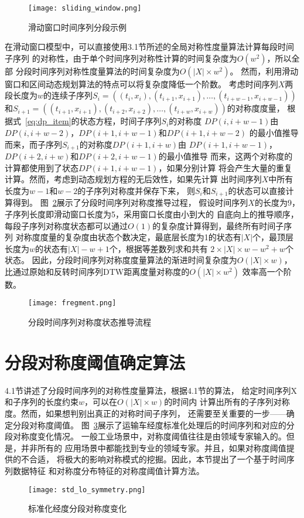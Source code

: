 \begin{figure}[h]
  \centering
  \texttt{[image: sliding\_window.png]}
  \caption{滑动窗口时间序列分段示例}
  \label{fig:sliding_window}
\end{figure}

在滑动窗口模型中，可以直接使用3.1节所述的全局对称性度量算法计算每段时间子序列
的对称性，由于单个时间序列对称性计算的时间复杂度为$O(w^2 )$，所以全部
分段时间序列对称性度量算法的时间复杂度为$O\left(|X| \times w^{2}\right)$。
然而，利用滑动窗口和区间动态规划算法的特点可以将复杂度降低一个阶数。
考虑时间序列$X$两段长度为$w$的连续子序列$S_{i}=\left(\left(t_{i}, x_{i}\right),\left(t_{i+1}, x_{i+1}\right), \dots,\left(t_{i+w-1}, x_{i+w-1}\right)\right)$
和$S_{i+1}=\left(\left(t_{i+1}, x_{i+1}\right),\left(t_{i+2}, x_{i+2}\right), \dots,\left(t_{i+w}, x_{i+w}\right)\right)$的对称度度量，
根据式~\ref{eq:dp_item}的状态方程，时间子序列$S_i$的对称度
$D P(i, i+w-1)$由$DP(i,i+w-2)$，$DP(i+1,i+w-1)$和$DP(i+1,i+w-2)$
的最小值推导而来，而子序列$S_{i+1}$的对称度$D P(i+1, i+w)$由
$D P(i+1, i+w-1)$，$DP(i+2,i+w)$和$DP(i+2,i+w-1)$的最小值推导
而来，这两个对称度的计算都使用到了状态$DP(i+1,i+w-1)$，如果分别计算
将会产生大量的重复计算。然而，考虑到动态规划方程的无后效性，如果先计算
出时间序列$X$中所有长度为$w-1$和$w-2$的子序列对称度并保存下来，
则$S_i$和$S_{i+1}$的状态可以直接计算得到。
图~\ref{fig:fregment}展示了分段时间序列对称度推导过程，
假设时间序列$X$的长度为9，子序列长度即滑动窗口长度为5，采用窗口长度由小到大的
自底向上的推导顺序，每段子序列对称度状态都可以通过$O(1)$的复杂度计算得到，最终所有时间子序列
对称度度量的复杂度由状态个数决定，最底层长度为1的状态有$|X|$个，最顶层
长度为$w$的状态有$|X|-w+1$个，根据等差数列求和共有
$2 \times|X| \times w-w^{2}+w$个状态。
因此，分段时间序列对称度度量算法的渐进时间复杂度为$O(|X| \times w)$，
比通过原始和反转时间序列DTW距离度量对称度的$O\left(|X| \times w^{2}\right)$
效率高一个阶数。
\begin{figure}
  \centering
  \texttt{[image: fregment.png]}
  \caption{分段时间序列对称度状态推导流程}
  \label{fig:fregment}
\end{figure}

\section{分段对称度阈值确定算法}

4.1节讲述了分段时间序列的对称性度量算法，根据4.1节的算法，
给定时间序列X和子序列的长度约束$w$，可以在$O(|X| \times w)$的时间内
计算出所有的子序列对称度。然而，如果想判别出真正的对称时间子序列，
还需要至关重要的一步——确定分段对称度阈值。
图~\ref{fig:lontitude_symmetry}展示了运输车经度标准化处理后的时间序列和对应的分段对称度变化情况。
一般工业场景中，对称度阈值往往是由领域专家输入的。但是，并非所有的
应用场景中都能找到专业的领域专家。并且，如果对称度阈值提供的不合适，
将极大的影响对称模式的挖掘。因此，本节提出了一个基于时间序列数据特征
和对称度分布特征的对称度阈值计算方法。
\begin{figure}
  \centering
  \texttt{[image: std\_lo\_symmetry.png]}
  \caption{标准化经度分段对称度变化}
  \label{fig:lontitude_symmetry}
\end{figure}

